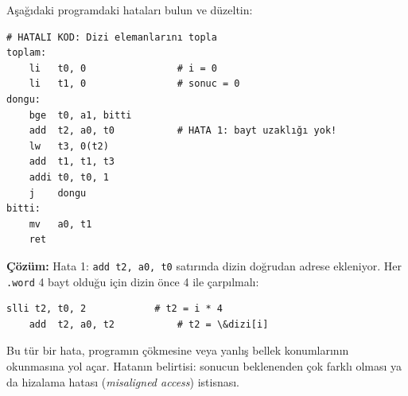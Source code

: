 \begin{ornek}[4.23]
\label{orn:hata-ornek}
Aşağıdaki programdaki hataları bulun ve düzeltin:

\begin{lstlisting}[style=riscv]
# HATALI KOD: Dizi elemanlarını topla
toplam:
    li   t0, 0                # i = 0
    li   t1, 0                # sonuc = 0
dongu:
    bge  t0, a1, bitti
    add  t2, a0, t0           # HATA 1: bayt uzaklığı yok!
    lw   t3, 0(t2)
    add  t1, t1, t3
    addi t0, t0, 1
    j    dongu
bitti:
    mv   a0, t1
    ret
\end{lstlisting}

\textbf{Çözüm:} Hata 1: \texttt{add t2, a0, t0} satırında dizin doğrudan adrese ekleniyor. Her \texttt{.word} 4 bayt olduğu için dizin önce 4 ile çarpılmalı:

\begin{lstlisting}[style=riscv]
    slli t2, t0, 2            # t2 = i * 4
    add  t2, a0, t2           # t2 = \&dizi[i]
\end{lstlisting}

Bu tür bir hata, programın çökmesine veya yanlış bellek konumlarının okunmasına yol açar. Hatanın belirtisi: sonucun beklenenden çok farklı olması ya da hizalama hatası (\emph{misaligned access}) istisnası.
\end{ornek}

